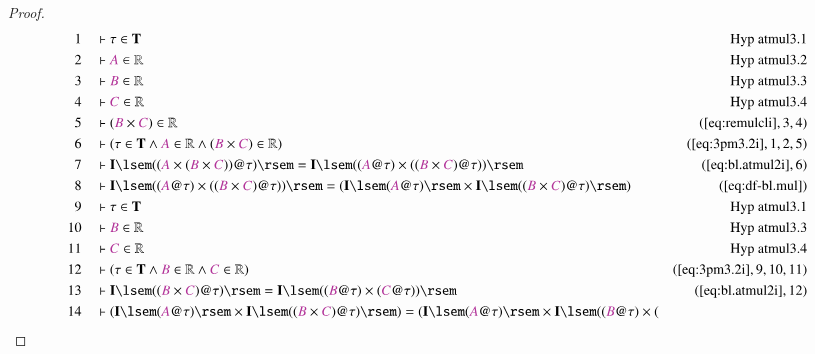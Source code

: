 \begin{proof}
\begin{align}
  1 &&  & \vdash \tau \in \mathbf{T}&\text{Hyp~atmul3.1}\notag%
  \\ 2 &&  & \vdash \mc{A} \in \mathbb{R}&\text{Hyp~atmul3.2}\notag%
  \\ 3 &&  & \vdash \mc{B} \in \mathbb{R}&\text{Hyp~atmul3.3}\notag%
  \\ 4 &&  & \vdash \mc{C} \in \mathbb{R}&\text{Hyp~atmul3.4}\notag%
  \\ 5 &&  & \vdash ( \mc{B} \times \mc{C} ) \in
      \mathbb{R}&(\mbox{\ref{eq:remulcli}},3,4)\notag
  \\ 6 &&  & \vdash ( \tau \in \mathbf{T} \wedge \mc{A} \in \mathbb{R} \wedge (
      \mc{B} \times \mc{C} ) \in \mathbb{R}
      )&(\mbox{\ref{eq:3pm3.2i}},1,2,5)\notag
  \\ 7 &&  & \vdash \mathbf{I} \lsem ( ( \mc{A} \times ( \mc{B} \times \mc{C} ) )
      @ \tau ) \rsem = \mathbf{I} \lsem ( ( \mc{A} @ \tau )
      \times ( ( \mc{B} \times \mc{C} ) @ \tau ) )
      \rsem&(\mbox{\ref{eq:bl.atmul2i}},6)\notag
  \\ 8 &&  & \vdash \mathbf{I} \lsem ( ( \mc{A} @ \tau ) \times ( ( \mc{B} \times
      \mc{C} ) @ \tau ) ) \rsem = ( \mathbf{I} \lsem (
      \mc{A} @ \tau ) \rsem \times \mathbf{I} \lsem ( (
      \mc{B} \times \mc{C} ) @ \tau ) \rsem
      )&(\mbox{\ref{eq:df-bl.mul}})\notag
  \\ 9 &&  & \vdash \tau \in \mathbf{T}&\text{Hyp~atmul3.1}\notag%
  \\ 10 &&  & \vdash \mc{B} \in
      \mathbb{R}&\text{Hyp~atmul3.3}\notag%
  \\ 11 &&  & \vdash \mc{C} \in
      \mathbb{R}&\text{Hyp~atmul3.4}\notag%
  \\ 12 &&  & \vdash ( \tau \in \mathbf{T} \wedge \mc{B} \in \mathbb{R} \wedge
      \mc{C} \in \mathbb{R}
      )&(\mbox{\ref{eq:3pm3.2i}},9,10,11)\notag
  \\ 13 &&  & \vdash \mathbf{I} \lsem ( ( \mc{B} \times \mc{C} ) @ \tau ) \rsem
      = \mathbf{I} \lsem ( ( \mc{B} @ \tau ) \times ( \mc{C}
      @ \tau ) )
      \rsem&(\mbox{\ref{eq:bl.atmul2i}},12)\notag
  \\ 14 &&  & \vdash ( \mathbf{I} \lsem ( \mc{A} @ \tau ) \rsem \times
      \mathbf{I} \lsem ( ( \mc{B} \times \mc{C} ) @ \tau )
      \rsem ) = ( \mathbf{I} \lsem ( \mc{A} @ \tau ) \rsem
      \times \mathbf{I} \lsem ( ( \mc{B} @ \tau ) \times (

\end{align}
\end{proof}
